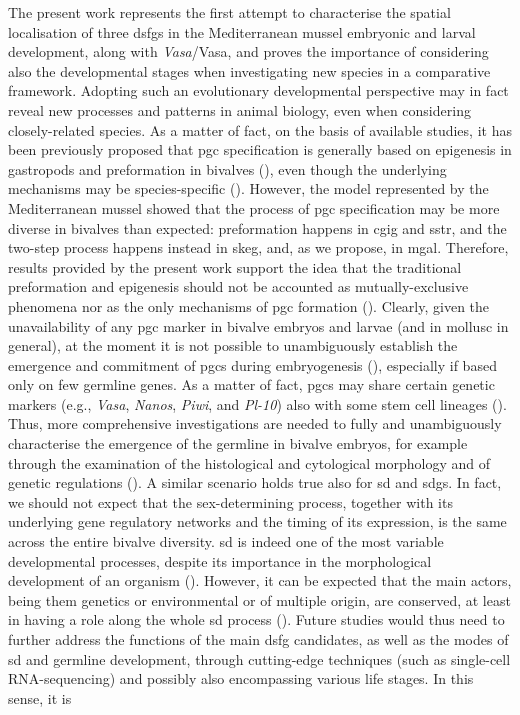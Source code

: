 The present work represents the first attempt to characterise the spatial localisation of three \glspl{dsfg} in the Mediterranean mussel embryonic and larval development, along with \textit{Vasa}/Vasa, and proves the importance of considering also the developmental stages when investigating new species in a comparative framework. Adopting such an evolutionary developmental perspective may in fact reveal new processes and patterns in animal biology, even when considering closely-related species. As a matter of fact, on the basis of available studies, it has been previously proposed that \gls{pgc} specification is generally based on epigenesis in gastropods and preformation in bivalves (), even though the underlying mechanisms may be species-specific (). However, the model represented by the Mediterranean mussel showed that the process of \gls{pgc} specification may be more diverse in bivalves than expected: preformation happens in \gls{cgig} and \gls{sstr}, and the two-step process happens instead in \gls{skeg}, and, as we propose, in \gls{mgal}. Therefore, results provided by the present work support the idea that the traditional preformation and epigenesis should not be accounted as mutually-exclusive phenomena nor as the only mechanisms of \gls{pgc} formation (). Clearly, given the unavailability of any \gls{pgc} marker in bivalve embryos and larvae (and in mollusc in general), at the moment it is not possible to unambiguously establish the emergence and commitment of \glspl{pgc} during embryogenesis (), especially if based only on few germline genes. As a matter of fact, \glspl{pgc} may share certain genetic markers (e.g., \textit{Vasa}, \textit{Nanos}, \textit{Piwi}, and \textit{Pl-10}) also with some stem cell lineages (). Thus, more comprehensive investigations are needed to fully and unambiguously characterise the emergence of the germline in bivalve embryos, for example through the examination of the histological and cytological morphology and of genetic regulations (). A similar scenario holds true also for \gls{sd} and \glspl{sdg}. In fact, we should not expect that the sex-determining process, together with its underlying gene regulatory networks and the timing of its expression, is the same across the entire bivalve diversity. \gls{sd} is indeed one of the most variable developmental processes, despite its importance in the morphological development of an organism (). However, it can be expected that the main actors, being them genetics or environmental or of multiple origin, are conserved, at least in having a role along the whole \gls{sd} process (). Future studies would thus need to further address the functions of the main \gls{dsfg} candidates, as well as the modes of \gls{sd} and germline development, through cutting-edge techniques (such as single-cell RNA-sequencing) and possibly also encompassing various life stages. In this sense, it is 